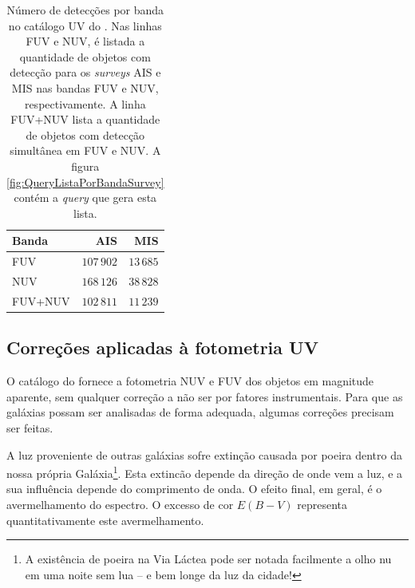 \begin{table}
	\caption[Número de detecções por banda no catálogo UV do \STARLIGHT.]
	{Número de detecções por banda no catálogo UV do \starlight. Nas linhas FUV e
	NUV, é listada a quantidade de objetos com detecção para os {\em
	surveys} AIS e MIS nas bandas FUV e NUV, respectivamente. A linha FUV+NUV
	lista a quantidade de objetos com detecção simultânea em FUV e NUV. A figura
	\ref{fig:QueryListaPorBandaSurvey} contém a {\em query} que gera esta lista.}
	\begin{tabular}{l|r r}
		Banda   &        AIS &       MIS \\
		\midrule
		FUV     & $107\,902$ & $13\,685$ \\
		NUV     & $168\,126$ & $38\,828$ \\
		FUV+NUV & $102\,811$ & $11\,239$ \\
	\end{tabular}
	\label{tab:DetBanda}
\end{table}

\subsection{Correções aplicadas à fotometria UV}
\label{sec:Crossmatch:DefAmostras:Correcoes}

O catálogo do \galex fornece a fotometria NUV e FUV dos objetos em magnitude
aparente, sem qualquer correção a não ser por fatores instrumentais. Para que as
galáxias possam ser analisadas de forma adequada, algumas correções precisam ser
feitas.

A luz proveniente de outras galáxias sofre extinção causada por poeira dentro da
nossa própria Galáxia\footnote{A existência de poeira na Via Láctea pode ser
notada facilmente a olho nu em uma noite sem lua -- e bem longe da luz da
cidade!}. Esta extincão depende da direção de onde vem a luz, e a sua influência
depende do comprimento de onda. O efeito final, em geral, é o avermelhamento do
espectro. O excesso de cor $E(B-V)$ representa quantitativamente este
avermelhamento.

